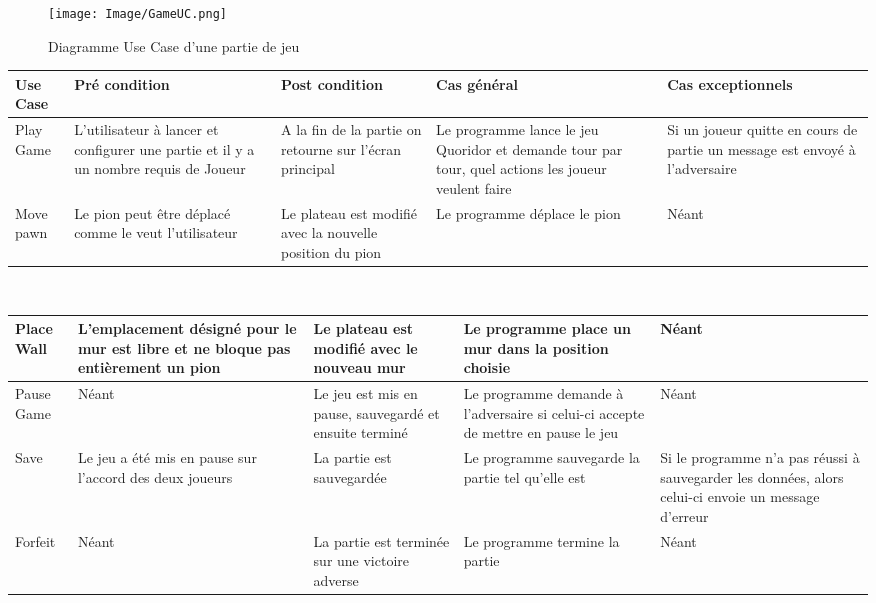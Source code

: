 \documentclass[french, utf8]{article}
\begin{document}
\begin{figure}[ht]
     \centering
    \texttt{[image: Image/GameUC.png]}
\caption{Diagramme Use Case d'une partie de jeu}
\end{figure}
\begin{center}
\begin{tabular}{|m{3cm}|m{3cm}|m{3cm}|m{3cm}|m{3cm}|}
\hline  Use Case & Pré condition      &  Post condition  & Cas général & Cas exceptionnels\\
\hline Play Game & L'utilisateur à lancer et configurer une partie et il y a un nombre requis de Joueur & A la fin de la partie on retourne sur l'écran principal & Le programme lance le jeu Quoridor et demande tour par tour, quel actions les joueur veulent faire & Si un joueur quitte en cours de partie un message est envoyé à l'adversaire  \\
\hline Move pawn  & Le pion peut être déplacé comme le veut l'utilisateur & Le plateau est modifié avec la nouvelle position du pion & Le programme déplace le pion & Néant \\
\hline
\end{tabular}\\
\end{center}
\begin{center}
\begin{tabular}{|m{3cm}|m{3cm}|m{3cm}|m{3cm}|m{3cm}|}
\hline Place Wall  & L'emplacement désigné pour le mur est libre et ne bloque pas entièrement un pion & Le plateau est modifié avec le nouveau mur & Le programme place un mur dans la position choisie & Néant \\
\hline Pause Game  & Néant & Le jeu est mis en pause, sauvegardé et ensuite terminé & Le programme demande à l'adversaire si celui-ci accepte de mettre en pause le jeu & Néant \\
\hline Save  & Le jeu a été mis en pause sur l'accord des deux joueurs & La partie est sauvegardée & Le programme sauvegarde la partie tel qu'elle est & Si le programme n'a pas réussi à sauvegarder les données, alors celui-ci envoie un message d'erreur \\
\hline Forfeit  & Néant & La partie est terminée sur une victoire adverse & Le programme termine la partie & Néant \\
\hline
\end{tabular}\\
\end{center}
\end{document}
